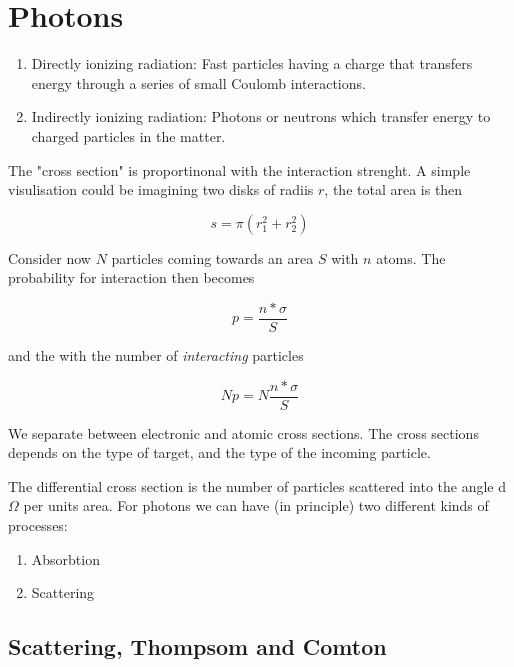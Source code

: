 \section{Photons}

\begin{enumerate}
    
    \item
	Directly ionizing radiation: Fast particles having a charge that transfers energy through a series of small Coulomb interactions.
    \item
	Indirectly ionizing radiation: Photons or neutrons which transfer energy to charged particles in the matter.

\end{enumerate}

The "cross section" is proportinonal with the interaction strenght.
A simple visulisation could be imagining two disks of radiis $r$, the total area is then 

\begin{equation}
    s = \pi (r_1^2 + r_2^2)
\end{equation}

Consider now $N$ particles coming towards an area $S$ with $n$ atoms.
The probability for interaction then becomes 

\begin{equation}
    p = \frac{n*\sigma}{S}
\end{equation}

and the with the number of \emph{interacting} particles

\begin{equation}
    Np = N\frac{n*\sigma}{S}
\end{equation}

We separate between electronic and atomic cross sections.
The cross sections depends on the type of target, and the type of the incoming particle.

The differential cross section is the number of particles scattered into the angle d$\Omega$ per units area.
For photons we can have (in principle) two different kinds of processes:

\begin{enumerate}

    \item
	Absorbtion
    \item
	Scattering
\end{enumerate}

\subsection{Scattering, Thompsom and Comton}

